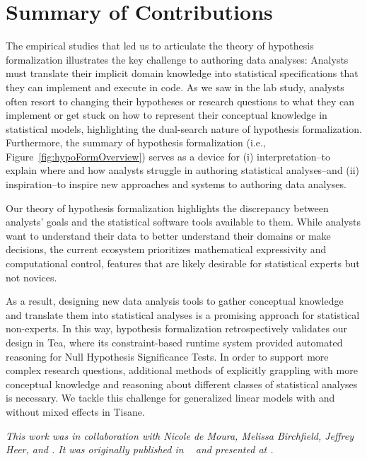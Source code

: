 

\section{Summary of Contributions}


The empirical studies that led us to articulate the theory of hypothesis
formalization illustrates the key challenge to authoring data analyses: Analysts
must translate their implicit domain knowledge into statistical specifications
that they can implement and execute in code. As we saw in the lab study,
analysts often resort to changing their hypotheses or research questions to what
they can implement or get stuck on how to represent their conceptual knowledge
in statistical models, highlighting the dual-search nature of hypothesis
formalization. Furthermore, the summary of hypothesis formalization (i.e.,
Figure~\ref{fig:hypoFormOverview}) serves as a device for (i) interpretation--to
explain where and how analysts struggle in authoring statistical analyses--and
(ii) inspiration--to inspire new approaches and systems to authoring data
analyses. 

Our theory of hypothesis formalization highlights the discrepancy between
analysts' goals and the statistical software tools available to them. While
analysts want to understand their data to better understand their domains or
make decisions, the current ecosystem prioritizes mathematical expressivity and
computational control, features that are likely desirable for statistical
experts but not novices. 

As a result, designing new data analysis tools to gather conceptual knowledge
and translate them into statistical analyses is a promising approach for
statistical non-experts. In this way, hypothesis formalization retrospectively
validates our design in Tea, where its constraint-based runtime system provided
automated reasoning for Null Hypothesis Significance Tests. In order to support
more complex research questions, additional methods of explicitly grappling with
more conceptual knowledge and reasoning about different classes of statistical
analyses is necessary. We tackle this challenge for generalized linear models
with and without mixed effects in Tisane. 

\textit{This work was in collaboration with Nicole de Moura, Melissa Birchfield, Jeffrey
Heer, and \reneJust. It was originally published in ~\cite{jun2022hypoForm} and presented
at .}